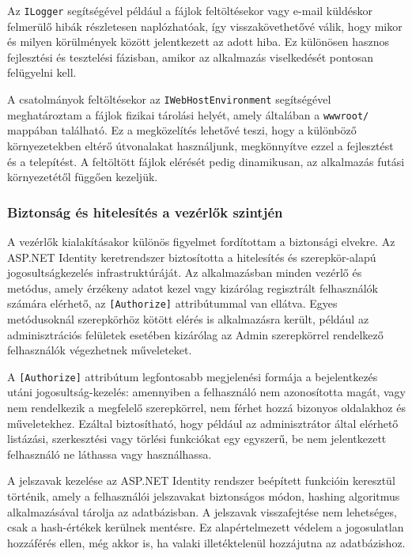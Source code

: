 Az \texttt{ILogger} segítségével például a fájlok feltöltésekor vagy e-mail küldéskor felmerülő hibák részletesen naplózhatóak, így visszakövethetővé válik, hogy mikor és milyen körülmények között jelentkezett az adott hiba. Ez különösen hasznos fejlesztési és tesztelési fázisban, amikor az alkalmazás viselkedését pontosan felügyelni kell.

A csatolmányok feltöltésekor az \texttt{IWebHostEnvironment} segítségével meghatároztam a fájlok fizikai tárolási helyét, amely általában a \texttt{wwwroot/} mappában található. Ez a megközelítés lehetővé teszi, hogy a különböző környezetekben eltérő útvonalakat használjunk, megkönnyítve ezzel a fejlesztést és a telepítést. A feltöltött fájlok elérését pedig dinamikusan, az alkalmazás futási környezetétől függően kezeljük.

\subsubsection{Biztonság és hitelesítés a vezérlők szintjén}
A vezérlők kialakításakor különös figyelmet fordítottam a biztonsági elvekre. Az ASP.NET Identity keretrendszer biztosította a hitelesítés és szerepkör-alapú jogosultságkezelés infrastruktúráját. Az alkalmazásban minden vezérlő és metódus, amely érzékeny adatot kezel vagy kizárólag regisztrált felhasználók számára elérhető, az \texttt{[Authorize]} attribútummal van ellátva. Egyes metódusoknál szerepkörhöz kötött elérés is alkalmazásra került, például az adminisztrációs felületek esetében kizárólag az Admin szerepkörrel rendelkező felhasználók végezhetnek műveleteket.

A \texttt{[Authorize]} attribútum legfontosabb megjelenési formája a bejelentkezés utáni jogosultság-kezelés: amennyiben a felhasználó nem azonosította magát, vagy nem rendelkezik a megfelelő szerepkörrel, nem férhet hozzá bizonyos oldalakhoz és műveletekhez. Ezáltal biztosítható, hogy például az adminisztrátor által elérhető listázási, szerkesztési vagy törlési funkciókat egy egyszerű, be nem jelentkezett felhasználó ne láthassa vagy használhassa.

A jelszavak kezelése az ASP.NET Identity rendszer beépített funkcióin keresztül történik, amely a felhasználói jelszavakat biztonságos módon, hashing algoritmus alkalmazásával tárolja az adatbázisban. A jelszavak visszafejtése nem lehetséges, csak a hash-értékek kerülnek mentésre. Ez alapértelmezett védelem a jogosulatlan hozzáférés ellen, még akkor is, ha valaki illetéktelenül hozzájutna az adatbázishoz.

